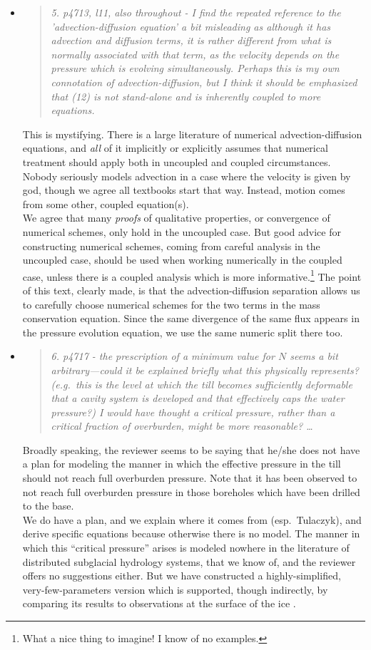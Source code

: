 \documentclass[11pt,reqno]{amsart}
\newcommand{\reply}[2]{
\medskip\medskip
\item  \begin{quote}
\emph{#1}
\end{quote}

\medskip
\noindent #2}
\begin{document}
\begin{itemize}
\reply{5. p4713, l11, also throughout - I find the repeated reference to the 'advection-diffusion equation' a bit misleading as although it has advection and diffusion terms, it is rather different from what is normally associated with that term, as the velocity depends on the pressure which is evolving simultaneously.  Perhaps this is my own connotation of advection-diffusion, but I think it should be emphasized that (12) is not stand-alone and is inherently coupled to more equations.}
{This is mystifying.  There is a large literature of numerical advection-diffusion equations, and \emph{all} of it implicitly or explicitly assumes that numerical treatment should apply both in uncoupled and coupled circumstances.  Nobody seriously models advection in a case where the velocity is given by god, though we agree all textbooks start that way.  Instead, motion comes from some other, coupled equation(s). \\
\indent We agree that many \emph{proofs} of qualitative properties, or convergence of numerical schemes, only hold in the uncoupled case.  But good advice for constructing numerical schemes, coming from careful analysis in the uncoupled case, should be used when working numerically in the coupled case, unless there is a coupled analysis which is more informative.\footnote{What a nice thing to imagine!  I know of no examples.}  The point of this text, clearly made, is that the advection-diffusion separation allows us to carefully choose numerical schemes for the two terms in the mass conservation equation.  Since the same divergence of the same flux appears in the pressure evolution equation, we use the same numeric split there too.}

\reply{6. p4717 - the prescription of a minimum value for $N$ seems a bit arbitrary---could it be explained briefly what this physically represents? (e.g.~this is the level at which the till becomes sufficiently deformable that a cavity system is developed and that effectively caps the water pressure?) I would have thought a critical pressure, rather than a critical fraction of overburden, might be more reasonable? \dots}
{Broadly speaking, the reviewer seems to be saying that he/she does not have a plan for modeling the manner in which the effective pressure in the till should not reach full overburden pressure.  Note that it has been observed to not reach full overburden pressure in those boreholes which have been drilled to the base. \\
\indent We do have a plan, and we explain where it comes from (esp.~Tulaczyk), and derive specific equations because otherwise there is no model.  The manner in which this ``critical pressure'' arises is modeled nowhere in the literature of distributed subglacial hydrology systems, that we know of, and the reviewer offers no suggestions either.  But we have constructed a highly-simplified, very-few-parameters version which is supported, though indirectly, by comparing its results to observations at the surface of the ice \cite{AschwandenAdalgeirsdottirKhroulev}.}


\end{itemize}
\end{document}
